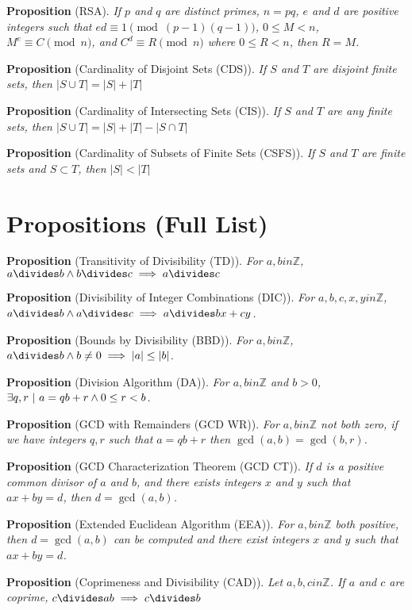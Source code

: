 \documentclass[12pt]{article}
\newcommand{\propositionlist}[2]{{\bf Proposition} (#1). \emph{#2}}
\begin{document}
\propositionlist{RSA}{If $p$ and $q$ are distinct primes, $n = pq$, $e$ and $d$ are positive integers such that $ed \equiv 1 \pmod {(p-1)(q-1)}$, $0 \leq M < n$, $M^e \equiv C \pmod n$, and $C^d \equiv R \pmod n$ where $0 \leq R < n$, then $R = M$.}

\propositionlist{Cardinality of Disjoint Sets (CDS)}{If $S$ and $T$ are disjoint finite sets, then $|S \cup T| = |S| + |T|$}

\propositionlist{Cardinality of Intersecting Sets (CIS)}{If $S$ and $T$ are any finite sets, then $|S \cup T| = |S| + |T| - |S \cap T|$}

\propositionlist{Cardinality of Subsets of Finite Sets (CSFS)}{If $S$ and $T$ are finite sets and $S \subset T$, then $|S| < |T|$}

\newpage

\section*{Propositions (Full List)}

\propositionlist{Transitivity of Divisibility (TD)}{For $a, b in \mathbb{Z}$, $a \divides b \land b \divides c \implies a \divides c$}

\propositionlist{Divisibility of Integer Combinations (DIC)}{For $a,b,c,x,y in \mathbb{Z}$, $a \divides b \land a \divides c \implies a \divides bx + cy$.}

\propositionlist{Bounds by Divisibility (BBD)}{For $a,b in \mathbb{Z}$, $a \divides b \land b \neq 0 \implies |a| \leq |b|$.}

\propositionlist{Division Algorithm (DA)}{For $a,b in \mathbb{Z}$ and $b > 0$, $\exists q,r \ |\  a = qb + r \land 0 \leq r < b$.}

\propositionlist{GCD with Remainders (GCD WR)}{For $a,b in \mathbb{Z}$ not both zero, if we have integers $q,r$ such that $a = qb + r$ then $\gcd(a,b) = \gcd(b,r)$.}

\propositionlist{GCD Characterization Theorem (GCD CT)}{If $d$ is a positive common divisor of $a$ and $b$, and there exists integers $x$ and $y$ such that $ax + by = d$, then $d = \gcd(a,b)$.}

\propositionlist{Extended Euclidean Algorithm (EEA)}{For $a,b in \mathbb{Z}$ both positive, then $d = \gcd(a,b)$ can be computed and there exist integers $x$ and $y$ such that $ax + by = d$.}

\propositionlist{Coprimeness and Divisibility (CAD)}{Let $a,b,c in \mathbb{Z}$. If $a$ and $c$ are coprime, $c \divides ab \implies c \divides b$}
\end{document}
